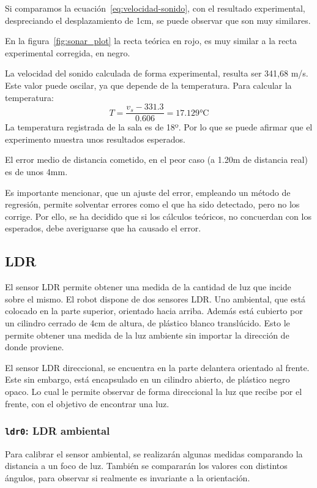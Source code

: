 \documentclass[10pt,a4paper,hidelinks,twocolumn]{article}
\begin{document}
Si comparamos la ecuación~\ref{eq:velocidad-sonido}, con el resultado 
experimental, despreciando el desplazamiento de 1cm, se puede observar que son 
muy similares.

En la figura~\ref{fig:sonar_plot} la recta teórica en rojo, es muy similar a la
recta experimental corregida, en negro.

La velocidad del sonido calculada de forma experimental, resulta ser 341,68 m/s.  
Este valor puede oscilar, ya que depende de la temperatura. Para calcular la 
temperatura:
$$ T = \frac{v_{s}-331.3}{0.606} = 17.129 \si{\celsius} $$
La temperatura registrada de la sala es de 18º. Por lo que se puede afirmar que 
el experimento muestra unos resultados esperados.

El error medio de distancia cometido, en el peor caso (a 1.20m de distancia 
real) es de unos 4mm.

Es importante mencionar, que un ajuste del error, empleando un método de 
regresión, permite solventar errores como el que ha sido detectado, pero no los 
corrige. Por ello, se ha decidido que si los cálculos teóricos, no concuerdan 
con los esperados, debe averiguarse que ha causado el error.
\subsection{LDR}

El sensor LDR permite obtener una medida de la cantidad de luz que incide sobre 
el mismo. El robot dispone de dos sensores LDR. Uno ambiental, que está colocado 
en la parte superior, orientado hacia arriba. Además está cubierto por un 
cilindro cerrado de 4cm de altura, de plástico blanco translúcido. Esto le 
permite obtener una medida de la luz ambiente sin importar la dirección de donde 
proviene.

El sensor LDR direccional, se encuentra en la parte delantera orientado al 
frente. Este sin embargo, está encapsulado en un cilindro abierto, de plástico 
negro opaco. Lo cual le permite observar de forma direccional la luz que recibe 
por el frente, con el objetivo de encontrar una luz.
\subsubsection{\texttt{ldr0}: LDR ambiental}

Para calibrar el sensor ambiental, se realizarán algunas medidas comparando la 
distancia a un foco de luz. También se compararán los valores con distintos 
ángulos, para observar si realmente es invariante a la orientación.
\end{document}
